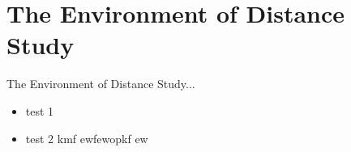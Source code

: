 \chapter{The Environment of Distance Study}
\label{The Environment of Distance Study}
The Environment of Distance Study...
\begin{itemize}
	\item test 1
	\item test 2 kmf ewfewopkf ew
\end{itemize}
